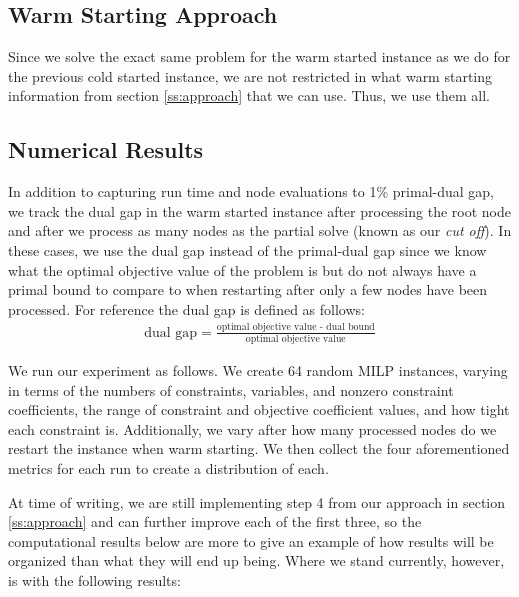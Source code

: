 \documentclass[10pt]{article}
\begin{document}
	\subsection{Warm Starting Approach}
	Since we solve the exact same problem for the warm started instance as we do for the previous cold started instance, we are not restricted in what warm starting information from section \ref{ss:approach} that we can use. Thus, we use them all.
	
	\subsection{Numerical Results}
	In addition to capturing run time and node evaluations to 1\% primal-dual gap, we track the dual gap in the warm started instance after processing the root node and after we process as many nodes as the partial solve (known as our \textit{cut off}). In these cases, we use the dual gap instead of the primal-dual gap since we know what the optimal objective value of the problem is but do not always have a primal bound to compare to when restarting after only a few nodes have been processed. For reference the dual gap is defined as follows:
	\begin{align}
		\text{dual gap} = \frac{\text{optimal objective value - dual bound}}{\text{optimal objective value}} \label{e:dual_gap}
	\end{align}
	
	We run our experiment as follows. We create 64 random MILP instances, varying in terms of the numbers of constraints, variables, and nonzero constraint coefficients, the range of constraint and objective coefficient values, and how tight each constraint is. Additionally, we vary after how many processed nodes do we restart the instance when warm starting. We then collect the four aforementioned metrics for each run to create a distribution of each.
	
	At time of writing, we are still implementing step 4 from our approach in section \ref{ss:approach} and can further improve each of the first three, so the computational results below are more to give an example of how results will be organized than what they will end up being. Where we stand currently, however, is with the following results:
	
\end{document}
